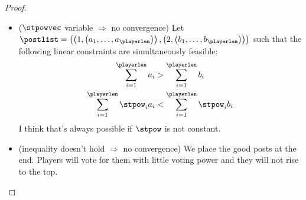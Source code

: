 \begin{proof}
\begin{itemize}
    \item ($\stpowvec$ variable $\Rightarrow$ no convergence) Let $\postlist =
    \left(\left(1, \left(a_1, \dots, a_\playerlen\right)\right), \left(2,
    \left(b_1, \dots, b_\playerlen\right)\right)\right)$ such that the following
    linear constraints are simultaneously feasible:
    \begin{gather*}
      \sum\limits_{i=1}^\playerlen a_i > \sum\limits_{i=1}^\playerlen b_i \\
      \sum\limits_{i=1}^\playerlen \stpow_i a_i < \sum\limits_{i=1}^\playerlen
      \stpow_i  b_i
    \end{gather*}
    I think that's always possible if $\stpow$ is not constant.
    \item (inequality doesn't hold $\Rightarrow$ no convergence) We place the
    good posts at the end. Players will vote for them with little voting power
    and they will not rise to the top.
  \end{itemize}
\end{proof}
